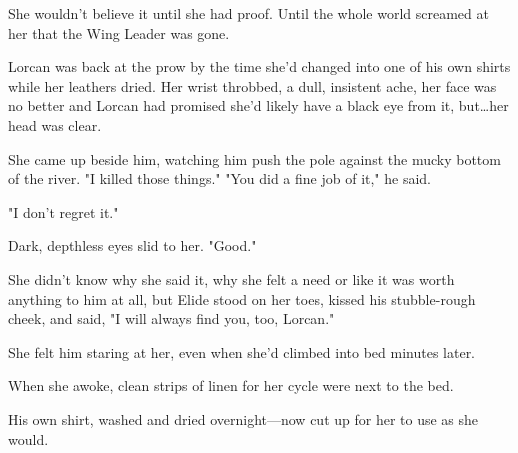 She wouldn't believe it until she had proof.
Until the whole world screamed at her that the Wing Leader was gone.

Lorcan was back at the prow by the time she'd changed into one of his own shirts while her leathers dried.
Her wrist throbbed, a dull, insistent ache, her face was no better and Lorcan had promised she'd likely have a black eye from it, but\ldots her head was clear.

She came up beside him, watching him push the pole against the mucky bottom of the river.
"I killed those things."
"You did a fine job of it," he said.

"I don't regret it."

Dark, depthless eyes slid to her.
"Good."

She didn't know why she said it, why she felt a need or like it was worth anything to him at all, but Elide stood on her toes, kissed his stubble-rough cheek, and said, "I will always find you, too, Lorcan."

She felt him staring at her, even when she'd climbed into bed minutes later.

When she awoke, clean strips of linen for her cycle were next to the bed.

His own shirt, washed and dried overnight---now cut up for her to use as she would.
